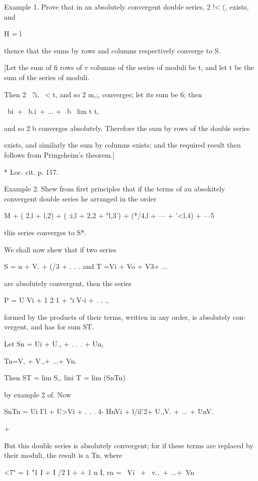 Example 1. Prove that in an absolutely convergent double series, 2 !<
(, exists, and

H = l

thence that the sums by rows and columns respectively converge to S.

[Let the sum of fi rows of v columns of the series of moduli be t,
and let t be the sum of the series of moduli.

Then 2 \ ?i, \ < t, and so 2 m,;, converges; let its sum be 6;
then

\ bi\ + \ b.i\ + ... + \ b \ lim t t,

and so 2 b converges absolutely. Therefore the sum by rows of the
double series

exists, and similarly the sum by columns exists; and the required
result then follows from Pringsheim's theorem.]

* Loc. cit. p. 117.

%
%

Example 2. Shew from first principles that if the terms of au
absokitely convergent double series he arranged in the order

 M + ( 2,l + l,2) + ( :i,l + 2,2 + "l,3') + (*/4,l + --- + '<l,4) +
---5

tliis series converges to S*.


We shall now shew that if two series

S = u + V. + (/3 + . . . and T =Vi + Vo + V3+ ...

are absolutely convergent, then the series

P = U Vi + 1 2 1 + "i V-i + . . .,

formed by the products of their terms, written in any order, is
absolutely con- vergent, and has for sum ST.

Let Sn = Ui + U., + . . . + Un,

Tn=V, + V.,+ ...+ Vn.

Then ST = lim S,, lini T = lim (SnTn)

by example 2 of. Now

SnTn = Ui I'l + U>Vi + . . . 4- HnVi + l/il'2+ U.,V. + ... + UnV.

+

But this double series is absolutely convergent; for if these terms
are replaced by their moduli, the result is a Tn, where

<7" = 1 "1 I + I /2 I +    + 1 n I, rn = \ Vi \ + \ v.,\ + ...+\
Vn\,

